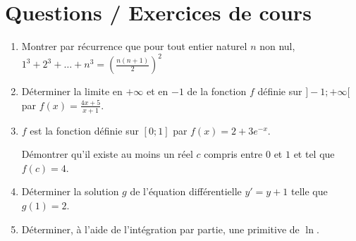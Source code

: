 \documentclass[french,bookmarks]{article}
\begin{document}
    \section*{Questions / Exercices de cours}
    
    \begin{enumerate}
        \item Montrer par récurrence que pour tout entier naturel $n$ non nul, \qquad $1^3 + 2^3 + \dots + n^3 = \left(\displaystyle\frac{n(n+1)}{2}\right)^2$
        
        
        \item Déterminer la limite en $+\infty$ et en $-1$ de la fonction $f$ définie sur $] -1; +\infty [$ par \qquad $f(x) = \displaystyle\frac{4x + 5}{x + 1}$.
        
        \item $f$ est la fonction définie sur $[0; 1]$ par \qquad $f(x) = 2 + 3e^{-x}$.
        
        Démontrer qu'il existe au moins un réel $c$ compris entre $0$ et $1$ et tel que $f(c) = 4$.
        
        \item Déterminer la solution $g$ de l'équation différentielle $y' = y + 1$ telle que $g(1) = 2$.
        
        \item Déterminer, à l'aide de l'intégration par partie, une primitive de $\ln$.
    \end{enumerate}
\end{document}
